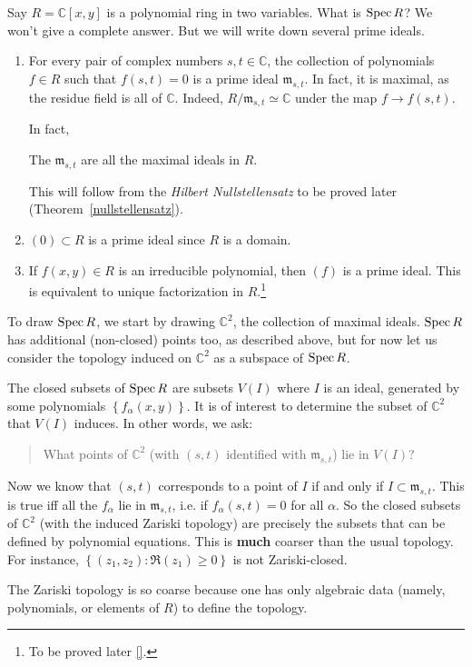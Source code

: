 \begin{example} \label{twovarpoly}
Say $R = \mathbb{C}[x,y]$ is a polynomial ring in two variables.  What is
$\operatorname{Spec} R$? We won't give a complete answer. But we will write down several
prime ideals.

\begin{enumerate}
\item For every pair of complex numbers $s,t \in \mathbb{C}$, the collection of polynomials
$f \in R$ such that $f(s,t) = 0$ is a prime ideal $\mathfrak{m} _{s,t}$.  In
fact, it is maximal, as the residue field is all of $\mathbb{C}$.  Indeed,
$R/\mathfrak{m}_{s,t} \simeq \mathbb{C}$ under the map $f \to f(s,t)$.  

In fact, 
\begin{theorem}
The $\mathfrak{m}_{s,t}$ are all the maximal ideals in $R$.
\end{theorem} 
This will follow from the \emph{Hilbert Nullstellensatz} to be proved later
(Theorem~\ref{nullstellensatz}).
\item $(0) \subset R$ is a prime ideal since $R$ is a domain. 
\item  If $f(x,y) \in R$ is an irreducible polynomial, then $(f)$ is a prime
ideal.  This is equivalent to unique factorization in $R$.\footnote{To be
proved later \ref{}.}  
\end{enumerate}

To draw $\operatorname{Spec} R$, we start by drawing $\mathbb{C}^2$, the collection of
maximal ideals.  $\operatorname{Spec} R$ has additional (non-closed) points too, as
described above, but for now let us
consider the topology induced on $\mathbb{C}^2$ as a subspace of $\operatorname{Spec} R$. 

The closed subsets of $\operatorname{Spec} R$ are subsets $V(I)$ where $I$ is an ideal,
generated by some polynomials $\left\{f_{\alpha}(x,y)\right\}$.  
It is of interest to determine  the  subset of $\mathbb{C}^2$ that $V(I)$
induces. In other words, we ask:
\begin{quote}
What points of $\mathbb{C}^2$ (with $(s,t)$ identified with
$\mathfrak{m}_{s,t}$) lie in $V(I)$?
\end{quote}
Now we know that $(s,t)$ corresponds to a point of $I$ if and only if  $I
\subset \mathfrak{m}_{s,t}$.
This is true iff all the
$f_{\alpha} $ lie in $ \mathfrak{m}_{s,t}$, i.e. if $f_{\alpha}(s,t) =0$ for all
$\alpha$.  So the closed subsets of $\mathbb{C}^2$ (with the induced Zariski
topology) are precisely the subsets
that can be defined by polynomial equations.  This is \textbf{much} coarser
than the usual topology.  For instance, $\left\{(z_1,z_2): \Re(z_1) \geq 0\right\}$ is
not Zariski-closed. 

The Zariski topology is so coarse because one has only algebraic data (namely,
polynomials, or elements of $R$) to define the topology.
\end{example} 

